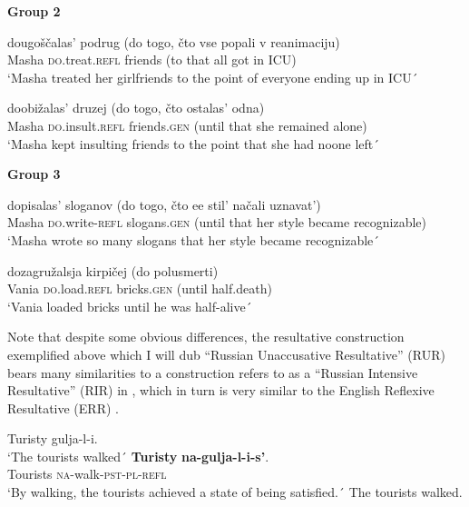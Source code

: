 \documentclass[output=paper,colorlinks,citecolor=brown]{./langscibook}
\begin{document}
\textbf{Group 2}


\ea%
    \label{ex:antonyuk:31}
       {dougoščalas’}     {podrug} {(do} {togo,} {čto} {vse} {popali} {v}  {reanimaciju)}\\
    Masha \textsc{do}.treat.\textsc{refl} friends (to that   {}       all  got      in {ICU})\\
    \glt `Masha treated her girlfriends to the point of everyone ending up in ICU´
    \z

\ea%
    \label{ex:antonyuk:32}
       {doobižalas’}         {druzej}            {(do}   {togo,} {čto} {ostalas’}   {odna)}\\
    Masha \textsc{do}.insult.\textsc{refl} friends.\textsc{gen}   (until that   she remained alone)\\
    \glt `Masha kept insulting friends to the point that she had noone left´
    \z

\textbf{Group 3}

\ea%
    \label{ex:antonyuk:33}
       {dopisalas’}            {sloganov}       {(do}     {togo,} {čto} {ee} {stil’} {načali} uznavat’)\\
    Masha \textsc{do}.write-\textsc{refl}  slogans.\textsc{gen}  (until that   her     style became recognizable)\\
    \glt `Masha wrote so many slogans that her style became recognizable´
    \z

\ea%
    \label{ex:antonyuk:34}
     {dozagružalsja}    {kirpičej}      {(do}    {polusmerti)}\\
    Vania \textsc{do}.load.\textsc{refl} bricks.\textsc{gen} (until half.death)\\
    \glt `Vania loaded bricks until he was half-alive´
    \z

Note that despite some obvious differences, the resultative construction exemplified above which I will dub “Russian Unaccusative Resultative” (RUR) bears many similarities to a construction \citet{Tatevosov2010} refers to as a “Russian Intensive Resultative” (RIR) in , which in turn is very similar to the English Reflexive Resultative (ERR) .


\ea%
    \label{ex:antonyuk:35}
    \ea \label{ex:antonyuk:35a}
    {Turisty} {gulja-l-i.}\\
    `The tourists walked´
    \ex \label{ex:antonyuk:35b}
    \gll \textbf{Turisty} \textbf{na-gulja-l-i-s’}. \\
    Tourists \textsc{na-}walk\textsc{-pst-pl-refl}\\
    \glt `By walking, the tourists achieved a state of being satisfied.´ The tourists walked. 
    \z
\z
\end{document}
